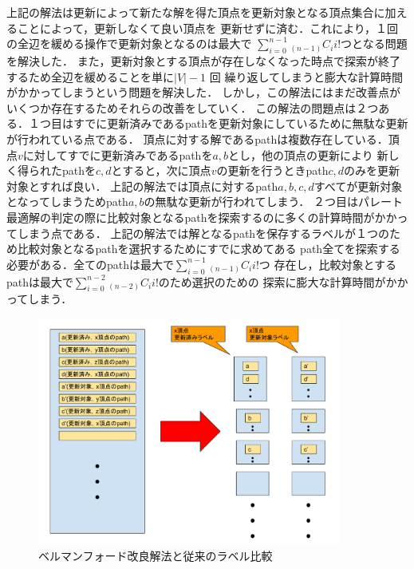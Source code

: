 \documentclass[12pt]{optlab-bachelor}
\begin{document}
上記の解法は更新によって新たな解を得た頂点を更新対象となる頂点集合に加えることによって，更新しなくて良い頂点を
更新せずに済む．これにより，１回の全辺を緩める操作で更新対象となるのは最大で
$\displaystyle \sum_{i=0}^{n-1} {}_{(n-1)}C_i i!$つとなる問題を解決した．
また，更新対象とする頂点が存在しなくなった時点で探索が終了するため全辺を緩めることを単に$|V|-1$ 回
繰り返してしまうと膨大な計算時間がかかってしまうという問題を解決した．
しかし，この解法にはまだ改善点がいくつか存在するためそれらの改善をしていく．
この解法の問題点は２つある．１つ目はすでに更新済みであるpathを更新対象にしているために無駄な更新が行われている点である．
頂点に対する解であるpathは複数存在している．頂点$v$に対してすでに更新済みであるpathを$a,b$とし，他の頂点の更新により
新しく得られたpathを$c,d$とすると，次に頂点$v$の更新を行うときpath$c,d$のみを更新対象とすれば良い．
上記の解法では頂点に対するpath$a,b,c,d$すべてが更新対象となってしまうためpath$a,b$の無駄な更新が行われてしまう．
２つ目はパレート最適解の判定の際に比較対象となるpathを探索するのに多くの計算時間がかかってしまう点である．
上記の解法では解となるpathを保存するラベルが１つのため比較対象となるpathを選択するためにすでに求めてある
path全てを探索する必要がある．全てのpathは最大で$\displaystyle \sum_{i=0}^{n-1} {}_{(n-1)}C_i i!$つ
存在し，比較対象とするpathは最大で$\displaystyle \sum_{i=0}^{n-2} {}_{(n-2)}C_i i!$のため選択のための
探索に膨大な計算時間がかかってしまう．

\begin{figure}[htbp]
  \centering
  \caption{ベルマンフォード改良解法と従来のラベル比較}
  \includegraphics[width=10.0cm]{fig/fig3.pdf}
\end{figure}
\end{document}

